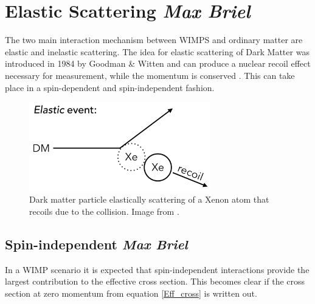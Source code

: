 \documentclass{article}
\begin{document}

% 

\FloatBarrier
\section{Elastic Scattering \small{\textit{Max Briel}}}

The two main interaction mechanism between WIMPS and ordinary matter are elastic and inelastic scattering. The idea for elastic scattering of Dark Matter was introduced in 1984 by Goodman \& Witten \cite{Goodman:1984dc} and can produce a nuclear recoil effect necessary for measurement, while the momentum is conserved \cite{Undagoitia:2015gya, Lewin:1995rx}. This can take place in a spin-dependent and spin-independent fashion. 

\begin{figure}[h]
    \centering
    \includegraphics[width=0.7\textwidth]{Elastic_Scattering.png}
    \caption{Dark matter particle elastically scattering of a Xenon atom that recoils due to the collision. Image from \cite{McCabe:2015eia}.}
    \label{elastic}
\end{figure}


\subsection{Spin-independent \small{\textit{Max Briel}}} 

In a WIMP scenario it is expected that spin-independent interactions provide the largest contribution to the effective cross section. This becomes clear if the cross section at zero momentum from equation \ref{Eff_cross} is written out. 
\end{document}
